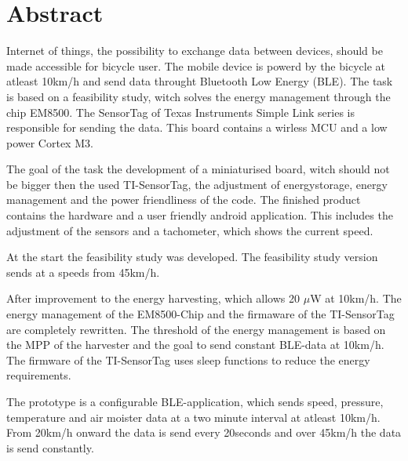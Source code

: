 \chapter{Abstract}

Internet of things, the possibility to exchange data between devices, should be made accessible for bicycle user. The mobile device is powerd by the bicycle at atleast 10km/h and send data throught Bluetooth Low Energy (BLE). The task is based on a feasibility study, witch solves the energy management through the chip EM8500. The SensorTag of Texas Instruments Simple Link series is responsible for sending the data. This board contains a wirless MCU and a low power Cortex M3.

The goal of the task the development of a miniaturised board, witch should not be bigger then the used TI-SensorTag, the adjustment of energystorage, energy management and the power friendliness of the code. The finished product contains the hardware and a user friendly android application. This includes the adjustment of the sensors and a tachometer, which shows the current speed.

At the start the feasibility study was developed. The feasibility study version sends at a speeds from 45km/h.

After improvement to the energy harvesting, which allows 20 $\mu$W at 10km/h. The energy management of the EM8500-Chip and the firmaware of the TI-SensorTag are completely rewritten. The threshold of the energy management is based on the MPP of the harvester and the goal to send constant BLE-data at 10km/h. The firmware of the TI-SensorTag uses sleep functions to reduce the energy requirements.

The prototype is a configurable BLE-application, which sends speed, pressure, temperature and air moister data at a two minute interval at atleast 10km/h. From 20km/h onward the data is send every  20seconds and over 45km/h the data is send constantly.
